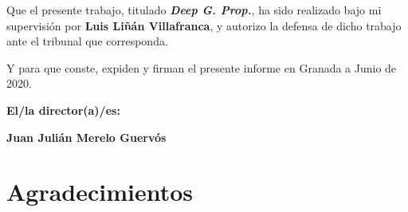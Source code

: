 \vspace{0.5cm}

Que el presente trabajo, titulado \textit{\textbf{Deep G. Prop.}}, ha sido
realizado bajo mi supervisión por \textbf{Luis Liñán Villafranca}, y autorizo
la defensa de dicho trabajo ante el tribunal que corresponda.

\vspace{0.5cm}

Y para que conste, expiden y firman el presente informe en Granada a Junio de
2020.

\vspace{1cm}

\textbf{El/la director(a)/es:}

\vspace{5cm}

\noindent\textbf{Juan Julián Merelo Guervós}

\chapter*{Agradecimientos}





